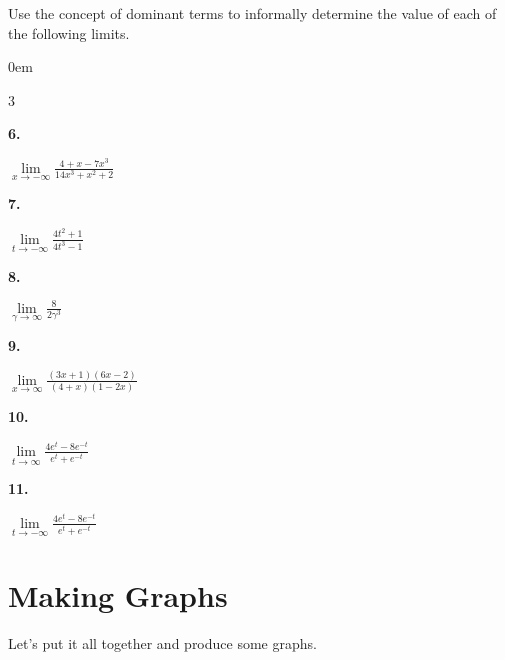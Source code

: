 \documentclass[12pt,]{book}
\theoremstyle{plain}
\theoremstyle{definition}
\numberwithin{equation}{section}
\newenvironment{exercisegroup}%
{\medskip\noindent}%
{\par\bigskip}%
\newlength{\exercisegroupindent}%
\newlength{\exercisegroupitemwidth}%
\newenvironment{exercisegrouplist}%
{\vspace{-\partopsep}%
\begin{adjustwidth}{\exercisegroupindent}{0em}}%
{\end{adjustwidth}%
\vspace{-\partopsep}%
\vspace{\baselineskip}}%
\newenvironment{exercisegroupbycol}[1]%
{\begin{exercisegrouplist}%
\vspace{-\multicolsep}%
\begin{multicols}{#1}%
\setlength{\parindent}{0em}%
\setlength{\exercisegroupitemwidth}{\linewidth}}%
{\end{multicols}%
\vspace{-\multicolsep}%
\end{exercisegrouplist}}%
\newenvironment{exercisegroupitem}[1]%
{\begin{minipage}[t]{\exercisegroupitemwidth}
\vspace{0pt}%
{\bfseries#1}%
\rule{0pt}{\baselineskip}}{\strut%
\end{minipage}%
\hspace{\columnsep}}%
\providecommand\phantomsection{}
\begin{document}
\begin{exercisegroup}%
Use the concept of dominant terms to informally determine the value of each of the following limits.%
\par
\begin{exercisegroupbycol}{3}%
\begin{exercisegroupitem}{6. }\phantomsection\hypertarget{exercise-52}{\null}
\(\lim\limits_{x\to-\infty}\frac{4+x-7x^3}{14x^3+x^2+2}\)%
\end{exercisegroupitem}%
\par%
\begin{exercisegroupitem}{7. }\phantomsection\hypertarget{exercise-53}{\null}
\(\lim\limits_{t\to-\infty}\frac{4t^2+1}{4t^3-1}\)%
\end{exercisegroupitem}%
\par%
\begin{exercisegroupitem}{8. }\phantomsection\hypertarget{exercise-54}{\null}
\(\lim\limits_{\gamma\to\infty}\frac{8}{2\gamma^3}\)%
\end{exercisegroupitem}%
\par%
\begin{exercisegroupitem}{9. }\phantomsection\hypertarget{exercise-55}{\null}
\(\lim\limits_{x\to\infty}\frac{(3x+1)(6x-2)}{(4+x)(1-2x)}\)%
\end{exercisegroupitem}%
\par%
\begin{exercisegroupitem}{10. }\phantomsection\hypertarget{exercise-56}{\null}
\(\lim\limits_{t\to\infty}\frac{4e^t-8e^{-t}}{e^t+e^{-t}}\)%
\end{exercisegroupitem}%
\par%
\begin{exercisegroupitem}{11. }\phantomsection\hypertarget{exercise-57}{\null}
\(\lim\limits_{t\to-\infty}\frac{4e^t-8e^{-t}}{e^t+e^{-t}}\)%
\end{exercisegroupitem}%
\par%
\end{exercisegroupbycol}%
\end{exercisegroup}%
\typeout{************************************************}
\typeout{************************************************}
\section[Making Graphs]{Making Graphs}\label{section-making-graphs}
Let's put it all together and produce some graphs.%
\typeout{************************************************}
\typeout{************************************************}
\end{document}
